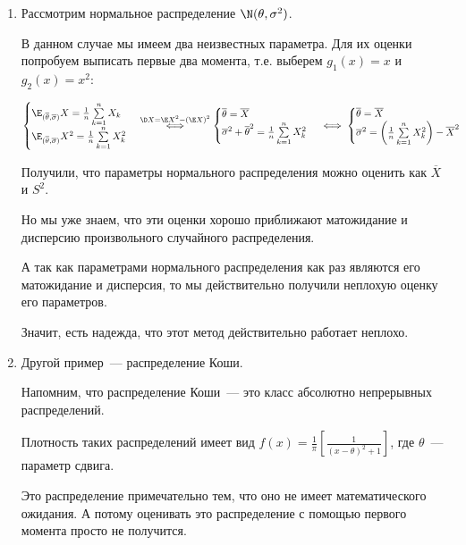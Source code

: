 \begin{example}
	\slashns
	
	\begin{enumerate}
		\item
		Рассмотрим нормальное распределение $\N(\theta, \sigma^2)$.
		
		В данном случае мы имеем два неизвестных параметра. Для их оценки попробуем выписать первые два момента, т.е. выберем $g_1(x) = x$ и $g_2(x) = x^2$:
		
		$\begin{cases}
		\E_{(\overline{\theta}, \overline{\sigma})} X = \frac1n \sum\limits_{k=1}^{n} X_k\\
		\E_{(\overline{\theta}, \overline{\sigma})} X^2 = \frac1n \sum\limits_{k=1}^{n} X_k^2
		\end{cases} 
		\overset{\D X = \E X^2 - (\E X)^2}{\iff}
		\begin{cases}
		\overline{\theta} = \overline{X}\\
		\overline{\sigma}^2 + \overline{\theta}^2 = \frac1n \sum\limits_{k=1}^{n} X_k^2
		\end{cases}
		\iff
		\begin{cases}
		\overline{\theta} = \overline{X}\\
		\overline{\sigma}^2 = \left(\frac1n \sum\limits_{k=1}^{n} X_k^2\right) - \overline{X}^2 
		\end{cases}$
		
		Получили, что параметры нормального распределения можно оценить как $\overline{X}$ и $S^2$.
		
		Но мы уже знаем, что эти оценки хорошо приближают матожидание и дисперсию произвольного случайного распределения. 
		
		А так как параметрами нормального распределения как раз являются его матожидание и дисперсия, то мы действительно получили неплохую оценку его параметров. 
		
		Значит, есть надежда, что этот метод действительно работает неплохо.
		
		\item
		Другой пример~--- распределение Коши.
		
		Напомним, что распределение Коши~--- это класс абсолютно непрерывных распределений.
		
		Плотность таких распределений имеет вид $f(x) = \frac1\pi \left[\frac{1}{(x- \theta)^2 + 1} \right]$, где $\theta$~--- параметр сдвига.
		
		Это распределение примечательно тем, что оно не имеет математического ожидания. А потому оценивать это распределение с помощью первого момента просто не получится.
	\end{enumerate}
\end{example}

